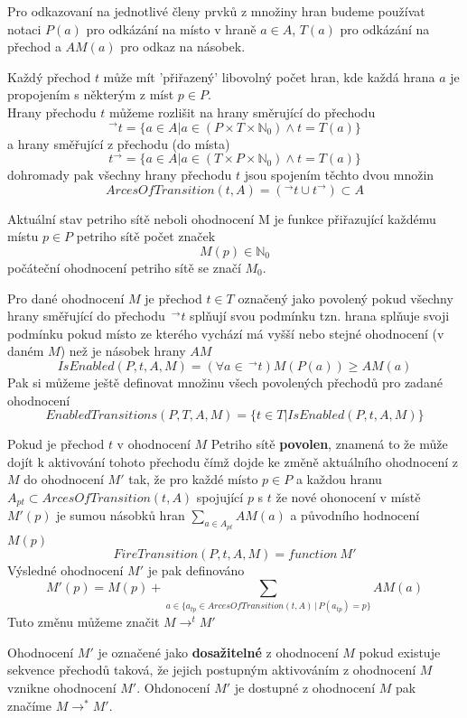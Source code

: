 \documentclass[
  biblatex,
  glossaries,
  index
]{kidiplom}
\begin{document}
Pro odkazovaní na jednotlivé členy prvků z množiny hran budeme používat
notaci $P(a)$ pro odkázání na místo v hraně $a \in A$,
$T(a)$ pro odkázání na přechod a $AM(a)$ pro odkaz na násobek.

Každý přechod $t$ může mít 'přiřazený' libovolný počet
hran, kde každá hrana $a$ je propojením s některým z míst $p \in P$.\\
Hrany přechodu $t$ můžeme rozlišit na hrany směrující do přechodu
$$^\to t = \{a \in A | a \in (P \times T \times \mathbb{N}_0) \land t = T(a)\}$$
a hrany směřující z přechodu (do místa)
$$ t ^\to  = \{a \in A | a \in (T \times P \times \mathbb{N}_0) \land t = T(a)\}$$
dohromady pak všechny hrany přechodu $t$ jsou spojením těchto dvou množin
$$ArcesOfTransition(t,A) = (^\to t \cup t ^\to) \subset A$$

Aktuální stav petriho sítě neboli ohodnocení M je funkce přiřazující každému
místu $p \in P$ petriho sítě počet značek
$$M(p) \in \mathbb{N}_0$$
počáteční ohodnocení petriho sítě se značí $M_{0}$.

Pro dané ohodnocení $M$ je přechod $t \in T$ označený jako povolený
pokud všechny hrany směřující do přechodu $\,^\to t$ splňují svou podmínku tzn.
hrana splňuje svoji podmínku pokud místo ze kterého vychází má vyšší nebo stejné ohodnocení
(v daném $M$) než je násobek hrany $AM$
$$IsEnabled(P,t,A,M) = (\forall a \in \,^\to t)M(P(a)) \geq AM(a)$$
Pak si můžeme ještě definovat množinu všech povolených přechodů pro zadané ohodnocení
$$
  EnabledTransitions(P,T,A,M) =
  \{ t \in T | IsEnabled(P,t,A,M) \}
$$

Pokud je přechod $t$ v ohodnocení $M$ Petriho sítě \textbf{povolen}, znamená to že může dojít
k aktivování tohoto přechodu čímž dojde ke změně aktuálního ohodnocení z $M$ do ohodnocení $M'$
tak, že pro každé místo $p \in P$ a každou hranu $A_{pt} \subset ArcesOfTransition(t,A)$ spojující $p$ s $t$
že nové ohonocení v místě $M'(p)$ je sumou násobků hran $\sum_{a \in A_{pt}} AM(a)$ a původního hodnocení $M(p)$
$$
  FireTransition(P,t,A,M) = function\:M'
$$
Výsledné ohodnocení $M'$ je pak definováno
$$
  M'(p) = M(p) + \sum_{a \in \{a_{tp} \in ArcesOfTransition(t,A) \,|\, P(a_{tp}) = p \}} AM(a)
$$
Tuto změnu můžeme značit $M \to ^t M'$

Ohodnocení $M'$ je označené jako \textbf{dosažitelné} z ohodnocení $M$ 
pokud existuje sekvence přechodů taková, že jejich postupným aktivováním
z ohodnocení $M$ vznikne ohodnocení $M'$.
Ohdonocení $M'$ je dostupné z ohodnocení $M$ pak značíme $M \to ^* M'$.
\end{document}
